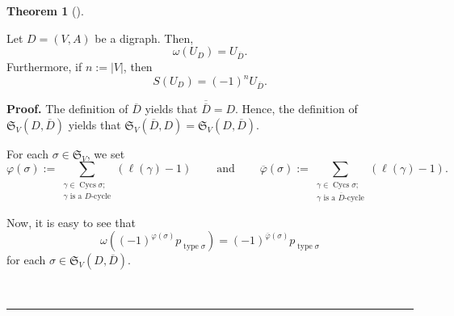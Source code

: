 \documentclass[numbers=enddot,12pt,final,onecolumn,notitlepage]{scrartcl}%
\numberwithin{exer}{section}
\theoremstyle{definition}
\newtheorem{theo}{Theorem}[section]
\newenvironment{theorem}[1][]
{\begin{theo}[#1]\begin{leftbar}}
{\end{leftbar}\end{theo}}
\newenvironment{proof}[1][Proof]{\noindent\textbf{#1.} }{\ \rule{0.5em}{0.5em}}
\let\sumnonlimits\sum
\renewcommand{\sum}{\sumnonlimits\limits}
\begin{document}
\begin{theorem}
\label{thm.antipode.U}Let $D=\left(  V,A\right)  $ be a digraph. Then,%
\begin{equation}
\omega\left(  U_{D}\right)  =U_{\overline{D}}. \label{eq.thm.antipode.U.omega}%
\end{equation}
Furthermore, if $n:=\left\vert V\right\vert $, then%
\begin{equation}
S\left(  U_{D}\right)  =\left(  -1\right)  ^{n}U_{\overline{D}}.
\label{eq.thm.antipode.U.S}%
\end{equation}

\end{theorem}

\begin{proof}
The definition of $\overline{D}$ yields that $\overline{\overline{D}}=D$.
Hence, the definition of $\mathfrak{S}_{V}\left(  D,\overline{D}\right)  $
yields that $\mathfrak{S}_{V}\left(  \overline{D},D\right)  =\mathfrak{S}%
_{V}\left(  D,\overline{D}\right)  $.

For each $\sigma\in\mathfrak{S}_{V}$, we set%
\[
\varphi\left(  \sigma\right)  :=\sum_{\substack{\gamma\in\operatorname*{Cycs}%
\sigma;\\\gamma\text{ is a }D\text{-cycle}}}\left(  \ell\left(  \gamma\right)
-1\right)  \ \ \ \ \ \ \ \ \ \ \text{and}\ \ \ \ \ \ \ \ \ \ \overline
{\varphi}\left(  \sigma\right)  :=\sum_{\substack{\gamma\in
\operatorname*{Cycs}\sigma;\\\gamma\text{ is a }\overline{D}\text{-cycle}%
}}\left(  \ell\left(  \gamma\right)  -1\right)  .
\]


Now, it is easy to see that%
\begin{equation}
\omega\left(  \left(  -1\right)  ^{\varphi\left(  \sigma\right)
}p_{\operatorname*{type}\sigma}\right)  =\left(  -1\right)  ^{\overline
{\varphi}\left(  \sigma\right)  }p_{\operatorname*{type}\sigma}
\label{pf.thm.antipode.U.4}%
\end{equation}
for each $\sigma\in\mathfrak{S}_{V}\left(  D,\overline{D}\right)  $.


\end{proof}
\end{document}
